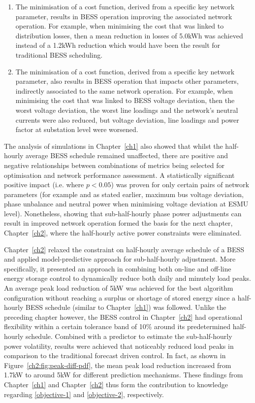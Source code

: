 \begin{enumerate}
	\item The minimisation of a cost function, derived from a specific key network parameter, results in BESS operation  improving the associated network operation. For example, when minimising the cost that was linked to distribution losses, then a mean reduction in losses of 5.0kWh was achieved instead of a 1.2kWh reduction which would have been the result for traditional BESS scheduling.
	\item The minimisation of a cost function, derived from a specific key network parameter, also results in BESS operation that impacts other parameters, indirectly associated to the same network operation. For example, when minimising the cost that was linked to BESS voltage deviation, then the worst voltage deviation, the worst line loadings and the network's neutral currents were also reduced, but voltage deviation, line loadings and power factor at substation level were worsened.
\end{enumerate}

The analysis of simulations in Chapter~\ref{ch1} also showed that whilst the half-hourly average BESS schedule remained unaffected, there are positive and negative relationships between combinations of metrics being selected for optimisation and network performance assessment.
A statistically significant positive impact (i.e. where $p<0.05$) was proven for only certain pairs of network parameters (for example and as stated earlier, maximum bus voltage deviation, phase unbalance and neutral power when minimising voltage deviation at ESMU level).
Nonetheless, showing that sub-half-hourly phase power adjustments can result in improved network operation formed the basis for the next chapter, Chapter~\ref{ch2}, where the half-hourly active power constraints were eliminated.

Chapter~\ref{ch2} relaxed the constraint on half-hourly average schedule of a BESS and applied model-predictive approach for sub-half-hourly adjustment.
More specifically, it presented an approach in combining both on-line and off-line energy storage control to dynamically reduce both daily and minutely load peaks.
An average peak load reduction of 5kW was achieved for the best algorithm configuration without reaching a surplus or shortage of stored energy since a half-hourly BESS schedule (similar to Chapter~\ref{ch1}) was followed.
Unlike the preceding chapter however, the BESS control in Chapter~\ref{ch2} had operational flexibility within a certain tolerance band of 10\% around its predetermined half-hourly schedule.
Combined with a predictor to estimate the sub-half-hourly power volatility, results were achieved that noticeably reduced load peaks in comparison to the traditional forecast driven control.
In fact, as shown in Figure~\ref{ch2:fig:peak-diff-pdf}, the mean peak load reduction increased from 1.7kW to around 5kW for different prediction mechanisms.
These findings from Chapter~\ref{ch1} and Chapter~\ref{ch2} thus form the contribution to knowledge regarding \ref{objective-1} and \ref{objective-2}, respectively.


